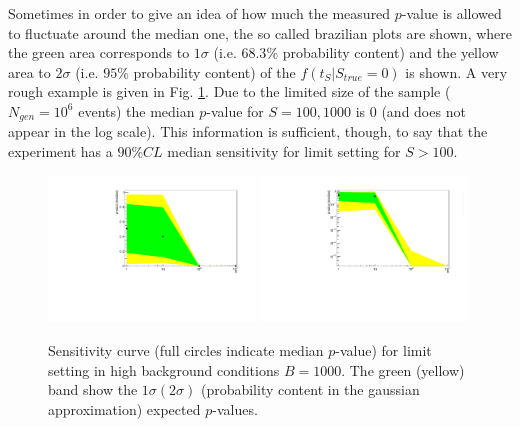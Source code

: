 \documentclass[10pt, oneside]{article}   	%
\begin{document}
Sometimes in order to give an idea of how much the measured $p$-value is allowed to fluctuate around the median one, the so called brazilian plots are shown, where the green area corresponds to $1\sigma$ (i.e. $68.3\%$ probability content) and the yellow area to $2\sigma$ (i.e. $95\%$ probability content) of the $f(t_S|S_{true}=0)$ is shown. A very rough example is given in Fig. \ref{fig:brazil}. 
Due to the limited size of the sample ($N_{gen} = 10^6$ events) the median $p$-value for $S=100,1000$ is $0$ (and does not appear in the log scale).  This information is sufficient, though, to say that the experiment has a $90\% CL$ median sensitivity for limit setting for $S > 100$.
\begin{figure}[h]
    \centering
    \includegraphics[width=0.49\textwidth]{brazil_lin.pdf} 
    \includegraphics[width=0.49\textwidth]{brazil_log.pdf}
    \caption{Sensitivity curve (full circles indicate median $p$-value) for limit setting in high background conditions $B=1000$. The green (yellow) band show the $1\sigma (2\sigma)$ (probability content in the gaussian approximation) expected $p$-values.}
    \label{fig:brazil}
\end{figure}
\end{document}
